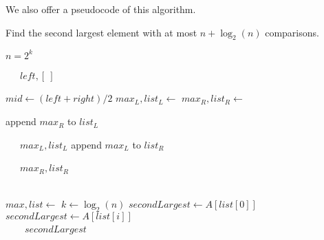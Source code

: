 We also offer a pseudocode of this algorithm.
\begin{algorithm}
    \caption{Find the second largest element with at most $n + \log_2(n)$ comparisons.}
    \begin{algorithmic}
        \Ensure $n = 2^k$
            
                \ \ \ \Return $left, [\ ]$
            \EndIf
            
            \State $mid \gets (left + right) / 2$
            \State $max_L, list_L \gets$ 
            \State $max_R, list_R \gets$ 
            
                \State append $max_R$ to $list_L$
                
                \ \ \ \Return $max_L, list_L$
            \Else
                \State append $max_L$ to $list_R$
                
                \ \ \ \Return $max_R, list_R$
            \EndIf
        \EndFunction
        
        \\
            \State $max, list \gets$ 
            \State $k \gets \log_2(n)$
            \State $secondLargest \gets A[list[0]]$
                    \State $secondLargest \gets A[list[i]]$
                \EndIf
            \EndFor
            \\\ \ \ \ \Return $secondLargest$
        \EndFunction
    \end{algorithmic}
\end{algorithm}


